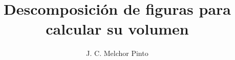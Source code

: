 \documentclass[12pt]{guia}
\title{Descomposición de figuras para calcular su volumen}
\author{J. C. Melchor Pinto}
\begin{document}
\pagestyle{headandfoot}
\addpoints
\INFO
\begin{questions}
    
    
    
    
    
    \newpage
    
    \newpage
    
    \newpage
    
    \newpage
    
    \newpage

\end{questions}

\end{document}
